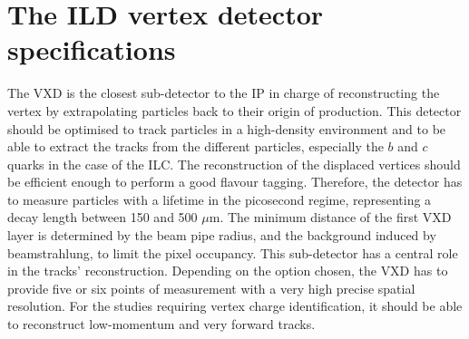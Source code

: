 







  \minitoc
  
  \section{The ILD vertex detector specifications}
   
    The \gls{VXD} is the closest sub-detector to the \acrfull{IP} in charge of reconstructing the vertex by extrapolating particles back to their origin of production. 
    This detector should be optimised to track particles in a high-density environment and to be able to extract the tracks from the different particles, especially the $b$ and $c$ quarks in the case of the \gls{ILC}.
    The reconstruction of the displaced vertices should be efficient enough to perform a good flavour tagging.
    Therefore, the detector has to measure particles with a lifetime in the picosecond regime, representing a decay length between 150 and 500 $\mu\text{m}$.
    The minimum distance of the first \gls{VXD} layer is determined by the beam pipe radius, and the background induced by beamstrahlung, to limit the pixel occupancy.
    This sub-detector has a central role in the tracks' reconstruction.
    Depending on the option chosen, the \gls{VXD} has to provide five or six points of measurement with a very high precise spatial resolution.
    For the studies requiring vertex charge identification, it should be able to reconstruct low-momentum and very forward tracks.
   

